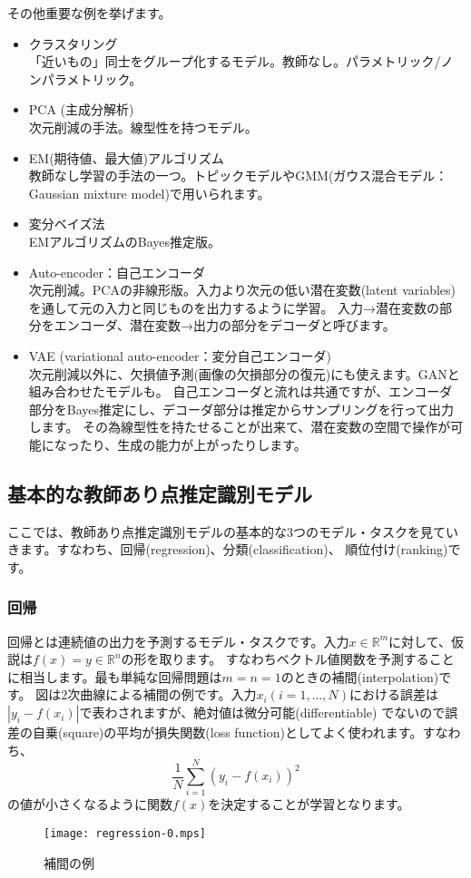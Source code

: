 \documentclass[a4j]{jarticle}
\newcommand{\R}[0]{\mathbb{R}}
\begin{document}
その他重要な例を挙げます。
\begin{itemize}
\item クラスタリング \\
「近いもの」同士をグループ化するモデル。教師なし。パラメトリック/ノンパラメトリック。
\item PCA (主成分解析)\\
次元削減の手法。線型性を持つモデル。
\item EM(期待値、最大値)アルゴリズム \\
教師なし学習の手法の一つ。トピックモデルやGMM(ガウス混合モデル：Gaussian mixture model)で用いられます。
\item 変分ベイズ法 \\
EMアルゴリズムのBayes推定版。
\item Auto-encoder：自己エンコーダ\\
次元削減。PCAの非線形版。入力より次元の低い潜在変数(latent variables)を通して元の入力と同じものを出力するように学習。
入力→潜在変数の部分をエンコーダ、潜在変数→出力の部分をデコーダと呼びます。
\item VAE (variational auto-encoder：変分自己エンコーダ)\\
次元削減以外に、欠損値予測(画像の欠損部分の復元)にも使えます。GANと組み合わせたモデルも。
自己エンコーダと流れは共通ですが、エンコーダ部分をBayes推定にし、デコーダ部分は推定からサンプリングを行って出力します。
その為線型性を持たせることが出来て、潜在変数の空間で操作が可能になったり、生成の能力が上がったりします。
\end{itemize}


\subsection{基本的な教師あり点推定識別モデル}
ここでは、教師あり点推定識別モデルの基本的な$3$つのモデル・タスクを見ていきます。すなわち、回帰(regression)、分類(classification)、
順位付け(ranking)です。

\subsubsection{回帰}
回帰とは連続値の出力を予測するモデル・タスクです。入力$x\in\R^m$に対して、仮説は$f(x) = y\in\R^n$の形を取ります。
すなわちベクトル値関数を予測することに相当します。最も単純な回帰問題は$m=n=1$のときの補間(interpolation)です。
図は$2$次曲線による補間の例です。入力$x_i (i=1,\ldots,N)$における誤差は$|y_i-f(x_i)|$で表わされますが、絶対値は微分可能(differentiable)
でないので誤差の自乗(square)の平均が損失関数(loss function)としてよく使われます。すなわち、
$$\frac1N\sum_{i=1}^N\left(y_i-f(x_i)\right)^2$$
の値が小さくなるように関数$f(x)$を決定することが学習となります。
\begin{figure}[h]
  \centering
  \texttt{[image: regression-0.mps]}
\caption{補間の例}
\end{figure}
\end{document}
